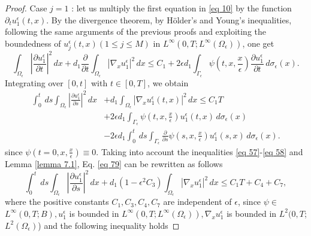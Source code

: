 \begin{proof}
Case $j=1$ : let us multiply the first equation in \eqref{eq 10} by the function $\partial_{t} u_{1}^{\epsilon}(t, x)$. By the divergence theorem, by Hölder's and Young's inequalities, following the same arguments of the previous proofs and exploiting the boundedness of $u_{j}^{\epsilon}(t, x)(1 \leq j \leq M)$ in $L^{\infty}\left(0, T ; L^{\infty}\left(\Omega_{\epsilon}\right)\right)$, one get
\begin{equation}
  \int_{\Omega_{\epsilon}}\left|\frac{\partial u_{1}^{\epsilon}}{\partial t}\right|^{2} \, d  x+d_{1} \frac{\partial}{\partial t} \int_{\Omega_{\epsilon}}\left|\nabla_{x} u_{1}^{\epsilon}\right|^{2} \, d  x \leq C_{1}+2 \epsilon d_{1} \int_{\Gamma_{\epsilon}} \psi\left(t, x, \frac{x}{\epsilon}\right) \frac{\partial u_{1}^{\epsilon}}{\partial t} \, d  \sigma_{\epsilon}(x).
\label{eq 78}\end{equation}
Integrating over $[0, t]$ with $t \in[0, T]$, we obtain
\begin{equation}
  \begin{aligned}
\int_{0}^{t} \, d  s \int_{\Omega_{\epsilon}}\left|\frac{\partial u_{1}^{\epsilon}}{\partial s}\right|^{2} \, d  x &+d_{1} \int_{\Omega_{\epsilon}}\left|\nabla_{x} u_{1}^{\epsilon}(t, x)\right|^{2} \, d  x \leq C_{1} T \\
&+2 \epsilon d_{1} \int_{\Gamma_{\epsilon}} \psi\left(t, x, \frac{x}{\epsilon}\right) u_{1}^{\epsilon}(t, x) \, {d} \sigma_{\epsilon}(x) \\
&-2 \epsilon d_{1} \int_{0}^{t} \, d  s \int_{\Gamma_{\epsilon}} \frac{\partial}{\partial s} \psi\left(s, x, \frac{x}{\epsilon}\right) u_{1}^{\epsilon}(s, x) \, {d} \sigma_{\epsilon}(x).
\end{aligned}
\label{eq 79}\end{equation}
since $\psi\left(t=0, x, \frac{x}{\epsilon}\right) \equiv 0$. Taking into account the inequalities \eqref{eq 57}-\eqref{eq 58} and Lemma \eqref{lemma 7.1}, Eq. \eqref{eq 79} can be rewritten as follows
\begin{equation}
  \int_{0}^{t} \, d  s \int_{\Omega_{\epsilon}}\left|\frac{\partial u_{1}^{\epsilon}}{\partial s}\right|^{2} \, d  x+d_{1}\left(1-\epsilon^{2} C_{3}\right) \int_{\Omega_{\epsilon}}\left|\nabla_{x} u_{1}^{\epsilon}\right|^{2} \, d  x \leq C_{1} T+C_{4}+C_{7},
\label{eq 80}\end{equation}
where the positive constants $C_{1}, C_{3}, C_{4}, C_{7}$ are independent of $\epsilon$, since $\psi \in$ $L^{\infty}(0, T ; B), u_{1}^{\epsilon}$ is bounded in $L^{\infty}\left(0, T ; L^{\infty}\left(\Omega_{\epsilon}\right)\right), \nabla_{x} u_{1}^{\epsilon}$ is bounded in $L^{2}(0, T$; $L^{2}\left(\Omega_{\epsilon}\right)$) and the following inequality holds

\end{proof}
